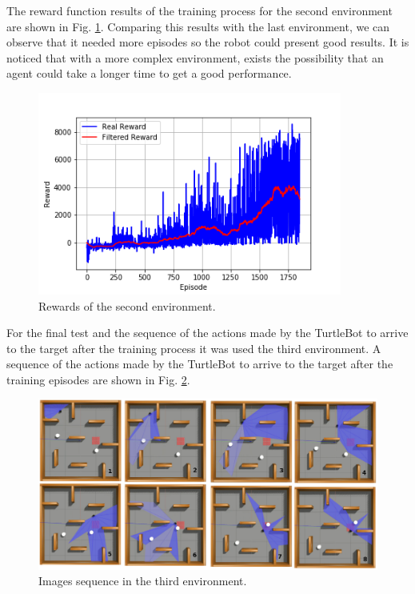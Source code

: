 The reward function results of the training process for the second environment are shown in Fig. \ref{fig:stage_2}.
Comparing this results with the last environment, we can observe that it needed more episodes so the robot could present good results.
It is noticed that with a more complex environment, exists the possibility that an agent could take a longer time to get a good performance.

\begin{figure}[H]
\centerline{\includegraphics[width=10cm]{images/stage_2.png}}
\caption{Rewards of the second environment.}
\label{fig:stage_2}
\end{figure}

For the final test and the sequence of the actions made by the TurtleBot to arrive to the target after the training process it was used the third environment.  A sequence of the actions made by the TurtleBot to arrive to the target after the training episodes are shown in Fig. \ref{fig:amb3target}.

\begin{figure}[H]
\centerline{\includegraphics[width=\columnwidth]{images/amb3target.png}}
\caption{Images sequence in the third environment.}
\label{fig:amb3target}
\end{figure}

